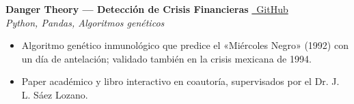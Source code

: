 \documentclass[12pt,a4paper]{article}
\begin{document}
\vspace{3pt}

\textbf{Danger Theory --- Detección de Crisis Financieras} \hfill \href{https://github.com/0xjoseangel/DANGER-THEORY-DT-}{\faGithub\ GitHub} \\
\textit{Python, Pandas, Algoritmos genéticos}
\begin{itemize}[leftmargin=1.2em,itemsep=1pt,topsep=2pt,parsep=0pt]
  \item Algoritmo genético inmunológico que predice el «Miércoles Negro» (1992) con un día de antelación; validado también en la crisis mexicana de 1994.
  \item Paper académico y libro interactivo en coautoría, supervisados por el Dr. J. L. Sáez Lozano.
\end{itemize}
\end{document}
